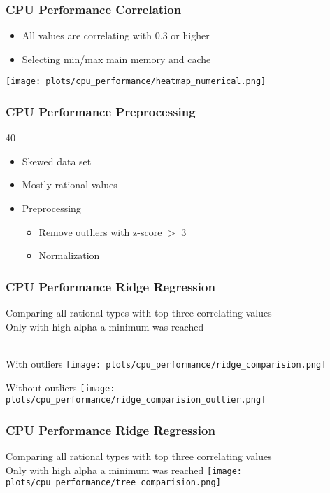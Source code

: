 \documentclass[aspectratio=169]{beamer}
\begin{document}
\begin{frame}{}
\frametitle{CPU Performance Correlation}
\begin{itemize}
	\item All values are correlating with 0.3 or higher
	\item Selecting min/max main memory and cache
\end{itemize}
    \center \texttt{[image: plots/cpu\_performance/heatmap\_numerical.png]}
\end{frame}

\begin{frame}{}
\frametitle{CPU Performance Preprocessing}40
\begin{itemize}
\item Skewed data set
\item Mostly rational values
\item Preprocessing
\begin{itemize}
\item Remove outliers with z-score $>$ 3
\item Normalization
\end{itemize}
\end{itemize}
\end{frame}

\begin{frame}{}
\frametitle{CPU Performance Ridge Regression}
Comparing all rational types with top three correlating values \\
Only with high alpha a minimum was reached \\ ~\\

\begin{minipage}{0.49\textwidth}
\center With outliers
   \texttt{[image: plots/cpu\_performance/ridge\_comparision.png]}
\end{minipage}
 \begin{minipage}{0.49\textwidth}
 \center Without outliers
   \texttt{[image: plots/cpu\_performance/ridge\_comparision\_outlier.png]}
\end{minipage}
\end{frame}

\begin{frame}{}
\frametitle{CPU Performance Ridge Regression}
Comparing all rational types with top three correlating values\\Only with high alpha a minimum was reached
    \center \texttt{[image: plots/cpu\_performance/tree\_comparision.png]}
\end{frame}
\end{document}
